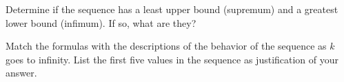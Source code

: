\begin{questions}

\question Determine if the sequence has a least upper bound (supremum) and a greatest lower bound (infimum). If so, what are they?


\newpage

\question Match the formulas with the descriptions of the behavior of the sequence as $k$ goes to infinity. List the first five values in the sequence as justification of your answer.
\begin{parts}
\end{parts}
\end{questions}
